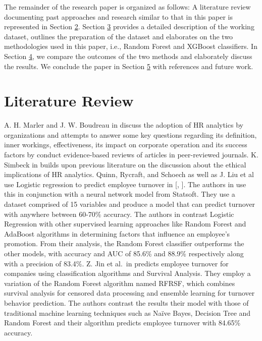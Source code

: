 \documentclass[runningheads]{llncs}
\begin{document}
The remainder of the research paper is organized as follows: A
literature review documenting past approaches and research similar to
that in this paper is represented in Section
\protect\hyperlink{literature-review}{2}. Section
\protect\hyperlink{methodology}{3} provides a detailed description of
the working dataset, outlines the preparation of the dataset and
elaborates on the two methodologies used in this paper, i.e., Random
Forest and XGBoost classifiers. In Section
\protect\hyperlink{results}{4}, we compare the outcomes of the two
methods and elaborately discuss the results. We conclude the paper in
Section \protect\hyperlink{conclusion}{5} with references and future
work.

\hypertarget{literature-review}{%
\section{Literature Review}\label{literature-review}}

A. H. Marler and J. W. Boudreau in
\cite{ref_Marler2017} discuss the adoption of HR
analytics by organizations and attempts to answer some key questions
regarding its definition, inner workings, effectiveness, its impact on
corporate operation and its success factors by conduct evidence-based
reviews of articles in peer-reviewed journals. K. Simbeck in
\cite{ref_Simbeck2019} builds upon previous
literature on the discussion about the ethical implications of HR
analytics. Quinn, Rycraft, and Schoech as well as J. Liu et al use
Logistic regression to predict employee turnover in
{[}\cite{ref_Quinn2002},
\cite{ref_Liu2019}{]}. The authors in
\cite{ref_Quinn2002} use this in conjunction with
a neural network model from Statsoft. They use a dataset comprised of 15
variables and produce a model that can predict turnover with anywhere
between 60-70\% accuracy. The authors in
\cite{ref_Liu2019} contrast Logistic Regression
with other supervised learning approaches like Random Forest and
AdaBoost algorithms in determining factors that influence an employee's
promotion. From their analysis, the Random Forest classifier outperforms
the other models, with accuracy and AUC of 85.6\% and 88.9\%
respectively along with a precision of 83.4\%. Z. Jin et al.~in
\cite{ref_Jin2020} predicts employee turnover for
companies using classification algorithms and Survival Analysis. They
employ a variation of the Random Forest algorithm named RFRSF, which
combines survival analysis for censored data processing and ensemble
learning for turnover behavior prediction. The authors contrast the
results their model with those of traditional machine learning
techniques such as Naïve Bayes, Decision Tree and Random Forest and
their algorithm predicts employee turnover with 84.65\% accuracy.
\end{document}
